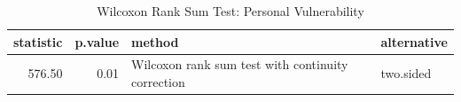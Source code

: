 \begin{table}[ht]
\centering
\begin{tabular}{rrll}
  \hline
statistic & p.value & method & alternative \\ 
  \hline
576.50 & 0.01 & Wilcoxon rank sum test with continuity correction & two.sided \\ 
   \hline
\end{tabular}
\caption{Wilcoxon Rank Sum Test: Personal Vulnerability} 
\end{table}
